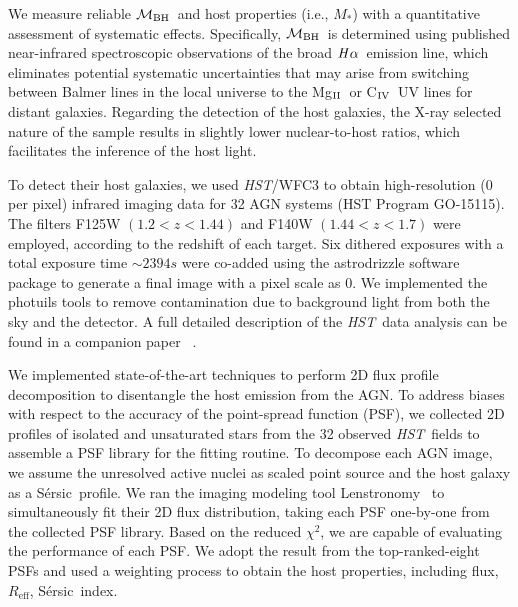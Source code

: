 \documentclass[twocolumn,trackchanges]{aastex63}
\newcommand{\hst}{{\it HST}}
\newcommand{\mbh}{$\mathcal M_{\rm BH}$}
\newcommand{\mr}{$Mag_{\rm ~R}$}
\newcommand{\halpha}{${\it H}\alpha$}
\newcommand{\sersic}{S\'ersic}
\newcommand{\lenstronomy}{{\sc Lenstronomy}}
\newcommand{\reff}{{$R_{\mathrm{eff}}$}}
\newcommand{\mstar}{{$M_*$}}
\newcommand{\Mgii}{Mg$_{\rm II}$}
\newcommand{\Civ}{C$_{\rm IV}$}
\begin{document}
We measure reliable \mbh\ and host properties (i.e., \mstar) with a quantitative assessment of systematic effects. Specifically, \mbh\ is determined using published near-infrared spectroscopic observations of the broad \halpha\ emission line, which eliminates potential systematic uncertainties that may arise from switching between Balmer lines in the local universe to the \Mgii\ or \Civ\ UV lines for distant galaxies. Regarding the detection of the host galaxies, the X-ray selected nature of the sample results in slightly lower nuclear-to-host ratios, which facilitates the inference of the host light. 

To detect their host galaxies, we used \hst/WFC3 to obtain high-resolution (0 per pixel) infrared imaging data for 32 AGN systems (HST Program GO-15115). The filters F125W $(1.2<z<1.44)$ and F140W $(1.44<z<1.7)$ were employed, according to the redshift of each target. Six dithered exposures with a total exposure time $\sim2394s$ were co-added using the {\sc astrodrizzle} software package to generate a final image with a pixel scale as 0. We implemented the {\sc photuils} tools to remove contamination due to background light from both the sky and the detector. A full detailed description of the \hst\ data analysis can be found in a companion paper ~\citep[][D19 hereafter]{Ding2019}.

We implemented state-of-the-art techniques to perform 2D flux profile decomposition to disentangle the host emission from the AGN. To address biases with respect to the accuracy of the point-spread function (PSF), we collected 2D profiles of isolated and unsaturated stars from the 32 observed \hst\ fields to assemble a PSF library for the fitting routine. To decompose each AGN image, we assume the unresolved active nuclei as scaled point source and the host galaxy as a \sersic\ profile. We ran the imaging modeling tool \lenstronomy~\citep{lenstronomy} to simultaneously fit their 2D flux distribution, taking each PSF one-by-one from the collected PSF library. Based on the reduced $\chi^2$, we are capable of evaluating the performance of each PSF. We adopt the result from the top-ranked-eight PSFs and used a weighting process to obtain the host properties, including flux, \reff, \sersic\ index.
\end{document}
